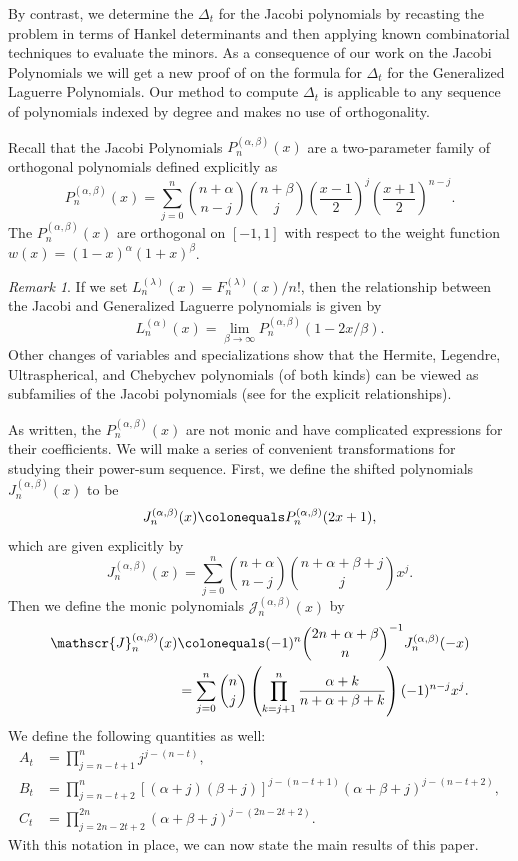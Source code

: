 \documentclass{amsart}
\newcommand{\ddef}{\colonequals}
\theoremstyle{plain}
\theoremstyle{remark}
\newtheorem{rmk}[equation]{Remark}
\begin{document}
By contrast, we determine the $\Delta_{t}$ for the Jacobi polynomials by recasting the problem in terms of Hankel determinants and then applying known combinatorial techniques to evaluate the minors.   As a consequence of our work on the Jacobi Polynomials we will get a new proof of \cite[Thm.~5.1]{feit} on the formula for $\Delta_t$ for the Generalized Laguerre Polynomials.  Our method to compute $\Delta_t$ is applicable to any sequence of polynomials indexed by degree and makes no use of orthogonality.  

Recall that the Jacobi Polynomials $P_n^{(\alpha,\beta)}(x)$ are a two-parameter family of orthogonal polynomials defined explicitly as
\[
P_n^{(\alpha,\beta)}(x) = \sum_{j=0}^n \binom{n+\alpha}{n-j}\binom{n+\beta}{j} \left(\frac{x-1}{2}\right)^j\left( \frac{x+1}{2} \right)^{n-j}.
\]
The $P_n^{(\alpha,\beta)}(x)$ are orthogonal on $[-1,1]$ with respect to the weight function $w(x) = (1-x)^\alpha(1+x)^\beta$.

\begin{rmk}
If we set $L_n^{(\lambda)}(x) = F_n^{(\lambda)}(x)/n!$, then the relationship between the Jacobi and Generalized Laguerre polynomials is given by \cite[(5.3.4)]{szego}
\[
L_n^{(\alpha)}(x) = \lim_{\beta \to \infty}P_n^{(\alpha,\beta)}(1-2x/\beta).
\]
Other changes of variables and specializations show that the Hermite, Legendre, Ultraspherical, and Chebychev polynomials (of both kinds) can be viewed as subfamilies of the Jacobi polynomials (see \cite[\S 2.4]{szego} for the explicit relationships).
\end{rmk}

As written, the $P_n^{(\alpha,\beta)}(x)$ are not monic and have complicated expressions for their coefficients.  We will make a series of convenient transformations for studying their power-sum sequence. First, we define the shifted polynomials $J_n^{(\alpha,\beta)}(x)$ to be 
\[
J_n^{(\alpha,\beta)}(x) \ddef P_n^{(\alpha,\beta)}(2x+1),
\]
which are given explicitly \cite[4.21.2]{szego} by
\[
J_n^{(\alpha,\beta)}(x) = \sum_{j=0}^n \binom{n+\alpha}{n-j}\binom{n+\alpha + \beta +j}{j} x^j.
\]
Then we define the monic polynomials $\mathscr{J}_n^{(\alpha,\beta)}(x)$ by 
\begin{align} \label{jac_def}
\mathscr{J}_n^{(\alpha,\beta)}(x) &\ddef (-1)^n\binom{2n+\alpha + \beta}{n}^{-1} J_n^{(\alpha,\beta)}(-x) \\
&= \sum_{j=0}^n \binom{n}{j} \left( \prod_{k=j+1}^n \frac{\alpha + k}{n+\alpha + \beta + k} \right) (-1)^{n-j}x^j.
\end{align}
We define the following quantities as well:
\begin{align}
A_{t} &= \prod_{j=n-t+1}^n j^{j-(n-t)}, \label{ADEF} \\
B_{t} &= \prod_{j=n-t+2}^n \left[(\alpha + j)(\beta+j)\right]^{j-(n-t+1)} \left(\alpha + \beta + j\right)^{j-(n-t+2)}, \label{BDEF} \\
C_{t} &= \prod_{j=2n-2t+2}^{2n} (\alpha + \beta + j)^{j-(2n-2t+2)}. \label{CDEF}
\end{align}
With this notation in place, we can now state the main results of this paper.
\end{document}
